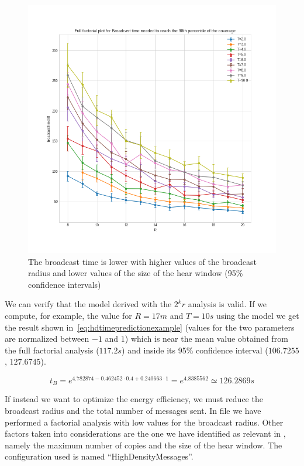 \begin{figure}
	\centering
	\includegraphics[width=\textwidth]{img/hd/broadcasttime-R-ffplot}
	\caption{The broadcast time is lower with higher values of the broadcast
	radius and lower values of the size of the hear
	window (95\% confidence intervals)}\label{fig:hdtimeff}
\end{figure}

We can verify that the model derived with the \(2^{k}r\) analysis is valid. If we
compute, for example, the value for \(R\!=\!17m\) and \(T\!=\!10s\) using the
model we get the result shown in~\eqref{eq:hdtimepredictionexample} (values for
the two parameters are normalized between \(-1\) and \(1\)) which is near the
mean value obtained from the full factorial analysis (\(117.2s\)) and inside its
95\% confidence interval (\(106.7255\), \(127.6745\)).

\begin{equation}\label{eq:hdtimepredictionexample}
	t_B = e^{4.782874 - 0.462452 \cdot 0.4 + 0.240663 \cdot 1} =
	e^{4.8385562} \simeq 126.2869s
\end{equation}

If instead we want to optimize the energy efficiency, we must reduce the
broadcast radius and the total number of messages sent. In file
 we have performed a factorial analysis with low values for
the broadcast radius. Other factors taken into considerations are the one we
have identified as relevant in , namely the maximum number
of copies and the size of the hear window. The configuration used is named
``HighDensityMessages''.


